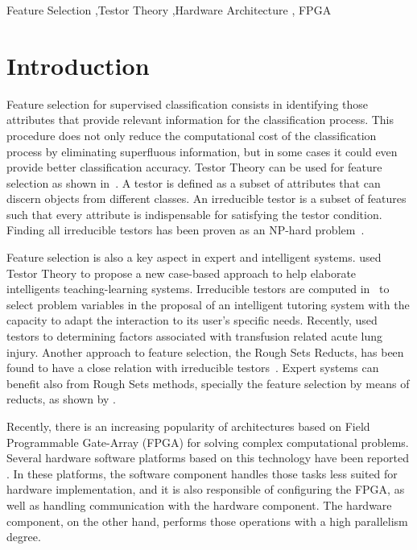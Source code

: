 \documentclass[authoryear,preprint,review,12pt]{elsarticle}
\begin{document}
\begin{frontmatter}
\begin{abstract}
\end{abstract}

\begin{keyword}
Feature Selection \sep Testor Theory \sep Hardware Architecture \sep
FPGA

\end{keyword}

\end{frontmatter}


\section{Introduction}
\label{sect:1}

Feature selection for supervised classification consists in identifying those attributes that 
provide relevant information for the classification process. This procedure does not only reduce the 
computational cost of the classification process by eliminating superfluous information, but in some cases 
it could even provide better classification accuracy. 
Testor Theory can be used for feature selection as shown in~\citep{R27,R5}. A testor is defined as a subset of attributes that can discern objects from different classes. An irreducible testor is a subset of features such that every attribute is indispensable for satisfying the testor condition. Finding all irreducible testors has been proven as an NP-hard problem~\citep{R40}.

Feature selection is also a key aspect in expert and intelligent systems. \cite{Mart07} used Testor Theory to
propose a new case-based approach to help elaborate intelligents teaching-learning systems.  Irreducible testors
are computed in~\citep{Med07} to select problem variables in the proposal of an intelligent tutoring system with
the capacity to adapt the interaction to its user's specific needs. Recently, \cite{Torr14} used testors to 
determining factors associated with transfusion related acute lung injury. Another approach to feature selection,
the Rough Sets Reducts, has been found to have a close relation with irreducible testors~\citep{Lazo15}. Expert
systems can benefit also from Rough Sets methods, specially the feature selection by means of reducts, as shown 
by \cite{Yah00}.

Recently, there is an increasing popularity of architectures based on Field Programmable Gate-Array (FPGA) 
for solving complex computational problems. Several hardware software platforms based on this technology have 
been reported \citep{R29,R30}. 
In these platforms, the software component handles those tasks less suited for hardware implementation, 
and it is also responsible of configuring the FPGA, as well as handling communication with the hardware component. 
The hardware component, on the other hand, performs those operations with a high parallelism degree.
\end{document}
